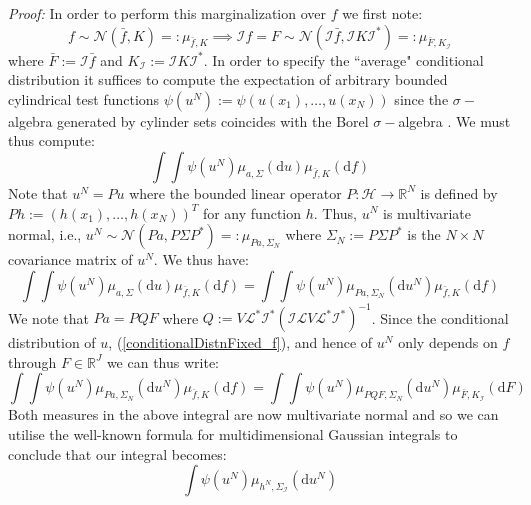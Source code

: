 \noindent \textit{Proof:}
In order to perform this marginalization over $f$ we first note:
\begin{equation}
    f\sim\mathcal{N}(\bar{f},K)=:\mu_{\bar{f},K} \implies \mathcal{I}f=F\sim\mathcal{N}(\mathcal{I}\bar{f},\mathcal{I}K\mathcal{I}^{*})=:\mu_{\bar{F},K_{\mathcal{I}}}
\end{equation}
where $\bar{F}:=\mathcal{I}\bar{f}$ and $K_{\mathcal{I}}:=\mathcal{I}K\mathcal{I}^{*}$. In order to specify the ``average" conditional distribution it suffices to compute the expectation of arbitrary bounded cylindrical test functions $\psi(u^{N}):=\psi(u(x_1),\dots,u(x_{N}))$ since the $\sigma-$algebra generated by cylinder sets coincides with the Borel $\sigma-$algebra \textcolor{blue}{\citep[see Theorem 2.1.1]{lunardi2015infinite}}. We must thus compute:
\begin{equation}
    \int\int\psi(u^{N})\mu_{a,\Sigma}(\mathrm{d}u)\mu_{\bar{f},K}(\mathrm{d}f)
\end{equation}
Note that $u^{N}=Pu$ where the bounded linear operator $P:\mathcal{H}\rightarrow\mathbb{R}^{N}$ is defined by $Ph:=(h(x_1),\dots,h(x_N))^T$ for any function $h$. Thus, $u^{N}$ is multivariate normal, i.e., $u^{N}\sim\mathcal{N}(Pa,P\Sigma P^{*})=:\mu_{Pa,\Sigma_{N}}$ where $\Sigma_{N}:=P\Sigma P^{*}$ is the $N\times N$ covariance matrix of $u^{N}$. We thus have:
\begin{equation}
    \int\int\psi(u^{N})\mu_{a,\Sigma}(\mathrm{d}u)\mu_{\bar{f},K}(\mathrm{d}f) = \int\int\psi(u^{N})\mu_{Pa,\Sigma_N}(\mathrm{d}u^{N})\mu_{\bar{f},K}(\mathrm{d}f)
\end{equation}
We note that $Pa=PQF$ where $Q:= V\mathcal{L}^{*}\mathcal{I}^{*}(\mathcal{I}\mathcal{L}V\mathcal{L}^{*}\mathcal{I}^{*})^{-1}$. Since the conditional distribution of $u$, (\ref{conditionalDistnFixed_f}), and hence of $u^{N}$ only depends on $f$ through $F\in\mathbb{R}^{J}$ we can thus write:
\begin{equation}
    \int\int\psi(u^{N})\mu_{Pa,\Sigma_N}(\mathrm{d}u^{N})\mu_{\bar{f},K}(\mathrm{d}f)=\int\int\psi(u^{N})\mu_{PQF,\Sigma_N}(\mathrm{d}u^{N})\mu_{\bar{F},K_{\mathcal{I}}}(\mathrm{d}F)
\end{equation}
Both measures in the above integral are now multivariate normal and so we can utilise the well-known formula for multidimensional Gaussian integrals to conclude that our integral becomes:
\begin{equation}
    \label{psi_integral_one}
    \int\psi(u^{N})\mu_{h^{N},\Sigma_{\mathcal{I}}}(\mathrm{d}u^{N})
\end{equation}
